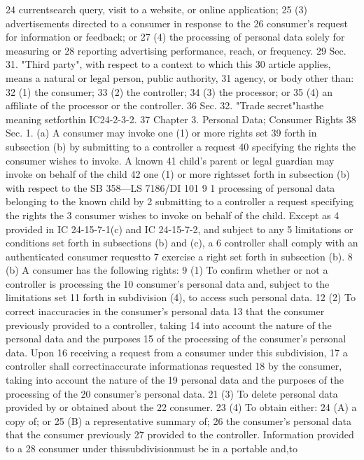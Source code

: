 24 currentsearch query, visit to a website, or online application;
25 (3) advertisements directed to a consumer in response to the
26 consumer's request for information or feedback; or
27 (4) the processing of personal data solely for measuring or
28 reporting advertising performance, reach, or frequency.
29 Sec. 31. "Third party", with respect to a context to which this
30 article applies, means a natural or legal person, public authority,
31 agency, or body other than:
32 (1) the consumer;
33 (2) the controller;
34 (3) the processor; or
35 (4) an affiliate of the processor or the controller.
36 Sec. 32. "Trade secret"hasthe meaning setforthin IC24-2-3-2.
37 Chapter 3. Personal Data; Consumer Rights
38 Sec. 1. (a) A consumer may invoke one (1) or more rights set
39 forth in subsection (b) by submitting to a controller a request
40 specifying the rights the consumer wishes to invoke. A known
41 child's parent or legal guardian may invoke on behalf of the child
42 one (1) or more rightsset forth in subsection (b) with respect to the
SB 358—LS 7186/DI 101
9
1 processing of personal data belonging to the known child by
2 submitting to a controller a request specifying the rights the
3 consumer wishes to invoke on behalf of the child. Except as
4 provided in IC 24-15-7-1(c) and IC 24-15-7-2, and subject to any
5 limitations or conditions set forth in subsections (b) and (c), a
6 controller shall comply with an authenticated consumer requestto
7 exercise a right set forth in subsection (b).
8 (b) A consumer has the following rights:
9 (1) To confirm whether or not a controller is processing the
10 consumer's personal data and, subject to the limitations set
11 forth in subdivision (4), to access such personal data.
12 (2) To correct inaccuracies in the consumer's personal data
13 that the consumer previously provided to a controller, taking
14 into account the nature of the personal data and the purposes
15 of the processing of the consumer's personal data. Upon
16 receiving a request from a consumer under this subdivision,
17 a controller shall correctinaccurate informationas requested
18 by the consumer, taking into account the nature of the
19 personal data and the purposes of the processing of the
20 consumer's personal data.
21 (3) To delete personal data provided by or obtained about the
22 consumer.
23 (4) To obtain either:
24 (A) a copy of; or
25 (B) a representative summary of;
26 the consumer's personal data that the consumer previously
27 provided to the controller. Information provided to a
28 consumer under thissubdivisionmust be in a portable and,to
